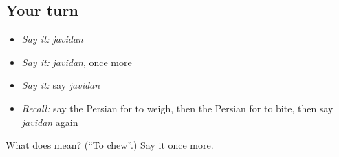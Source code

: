 \subsection*{Your turn}
\begin{itemize}
\raggedright
  \item \emph{Say it:} \emph{javidan}
  \item \emph{Say it:} \emph{javidan}, once more
  \item \emph{Say it:} say \emph{javidan}
  \item \emph{Recall:} say the Persian for to weigh, then the Persian for to bite, then say \emph{javidan} again
\end{itemize}

\begin{tcolorbox}[breakable,colback=teal!4,colframe=teal!35!black,title={Before you move on}]
What does  mean? (\textquotedblleft{}To chew\textquotedblright{}.) Say it once more.
\end{tcolorbox}
